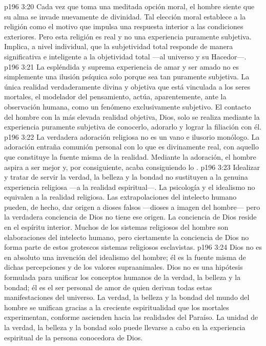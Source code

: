 \vs p196 3:20 Cada vez que toma una meditada opción moral, el hombre siente que su alma se invade nuevamente de divinidad. Tal elección moral establece a la religión como el motivo que impulsa una respuesta interior a las condiciones exteriores. Pero esta religión es real y no una experiencia puramente subjetiva. Implica, a nivel individual, que la subjetividad total responde de manera significativa e inteligente a la objetividad total ---al universo y su Hacedor---.
\vs p196 3:21 La espléndida y suprema experiencia de amar y ser amado no es simplemente una ilusión psíquica solo porque sea tan puramente subjetiva. La única realidad verdaderamente divina y objetiva que está vinculada a los seres mortales, el modelador del pensamiento, actúa, aparentemente, ante la observación humana, como un fenómeno exclusivamente subjetivo. El contacto del hombre con la más elevada realidad objetiva, Dios, solo se realiza mediante la experiencia puramente subjetiva de conocerlo, adorarlo y lograr la filiación con él.
\vs p196 3:22 La verdadera adoración religiosa no es un vano e ilusorio monólogo. La adoración entraña comunión personal con lo que es divinamente real, con aquello que constituye la fuente misma de la realidad. Mediante la adoración, el hombre aspira a ser mejor y, por consiguiente, acaba consiguiendo lo .
\vs p196 3:23 Idealizar y tratar de servir la verdad, la belleza y la bondad no sustituyen a la genuina experiencia religiosa ---a la realidad espiritual---. La psicología y el idealismo no equivalen a la realidad religiosa. Las extrapolaciones del intelecto humano pueden, de hecho, dar origen a dioses falsos ---dioses a imagen del hombre--- pero la verdadera conciencia de Dios no tiene ese origen. La conciencia de Dios reside en el espíritu interior. Muchos de los sistemas religiosos del hombre son elaboraciones del intelecto humano, pero ciertamente la conciencia de Dios no forma parte de estos grotescos sistemas religiosos esclavistas.
\vs p196 3:24 Dios no es en absoluto una invención del idealismo del hombre; él es la fuente misma de dichas percepciones y de los valores supraanimales. Dios no es una hipótesis formulada para unificar los conceptos humanos de la verdad, la belleza y la bondad; él es el ser personal de amor de quien derivan todas estas manifestaciones del universo. La verdad, la belleza y la bondad del mundo del hombre se unifican gracias a la creciente espiritualidad que los mortales experimentan, conforme ascienden hacia las realidades del Paraíso. La unidad de la verdad, la belleza y la bondad solo puede llevarse a cabo en la experiencia espiritual de la persona conocedora de Dios.
